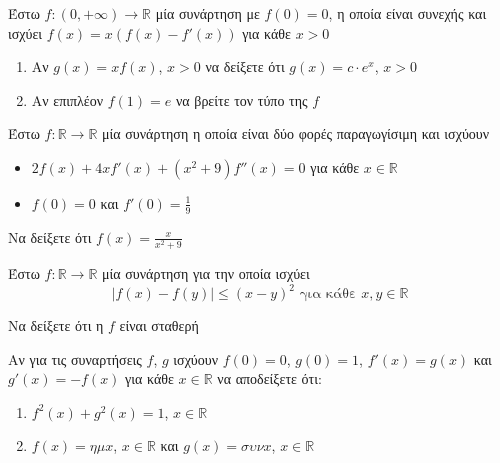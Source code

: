 \documentclass{presentation}
\begin{document}
\begin{askisi}
    Έστω $f:(0,+\infty)\to\mathbb{R}$ μία συνάρτηση με $f(0)=0$, η οποία είναι συνεχής και ισχύει $f(x)=x(f(x)-f'(x))$ για κάθε $x>0$
    \begin{enumerate}
        \item<1-> Αν $g(x)=xf(x)$, $x>0$ να δείξετε ότι $g(x)=c\cdot e^x$, $x>0$
        \item<2-> Αν επιπλέον $f(1)=e$ να βρείτε τον τύπο της $f$
    \end{enumerate}

\end{askisi}

\begin{askisi}
    Έστω $f:\mathbb{R}\to\mathbb{R}$ μία συνάρτηση η οποία είναι δύο φορές παραγωγίσιμη και ισχύουν
    \begin{itemize}
        \item $2f(x)+4xf'(x)+(x^2+9)f''(x)=0$ για κάθε $x\in\mathbb{R}$
        \item $f(0)=0$ και $f'(0)=\frac{1}{9}$
    \end{itemize}

    Να δείξετε ότι $f(x)=\frac{x}{x^2+9}$

\end{askisi}

\begin{askisi}
    Έστω $f:\mathbb{R}\to\mathbb{R}$ μία συνάρτηση για την οποία ισχύει
    $$|f(x)-f(y)|\le (x-y)^2 \text{ για κάθε } x,y\in\mathbb{R}$$

    Να δείξετε ότι η $f$ είναι σταθερή

\end{askisi}

\begin{askisi}
    Αν για τις συναρτήσεις $f$, $g$ ισχύουν $f(0)=0$, $g(0)=1$, $f'(x)=g(x)$ και $g'(x)=-f(x)$ για κάθε $x\in\mathbb{R}$ να αποδείξετε ότι:
    \begin{enumerate}
        \item<1-> $f^2(x)+g^2(x)=1$, $x\in\mathbb{R}$
        \item<2-> $f(x)=ημx$, $x\in\mathbb{R}$ και $g(x)=συνx$, $x\in\mathbb{R}$
    \end{enumerate}

\end{askisi}
\end{document}
